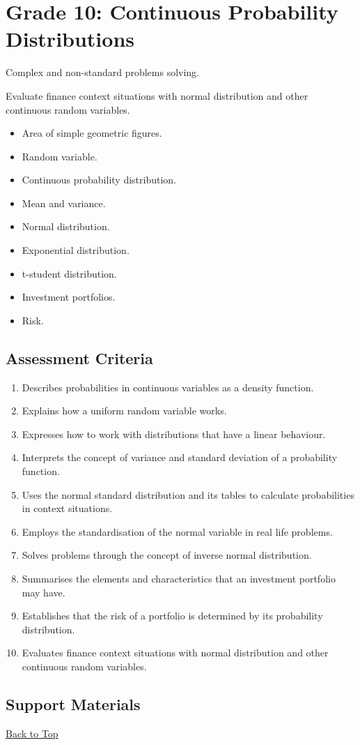 \section{Grade 10: Continuous Probability Distributions}\label{sec:grade10-term3-overview}

Complex and non-standard problems solving.

Evaluate finance context situations with normal distribution and other continuous random variables.

\begin{itemize}
	\item Area of simple geometric figures.
	\item Random variable.
	\item Continuous probability distribution.
	\item Mean and variance.
	\item Normal distribution.
	\item Exponential distribution.
	\item t-student distribution.
	\item Investment portfolios.
	\item Risk.
\end{itemize}

\subsection{Assessment Criteria}\label{sec:grade10-term3-criteria}

\begin{enumerate}
	\item Describes probabilities in continuous variables as a density function.
	\item Explains how a uniform random variable works.
	\item Expresses how to work with distributions that have a linear behaviour.
	\item Interprets the concept of variance and standard deviation of a probability function.
	\item Uses the normal standard distribution and its tables to calculate probabilities in context situations.
	\item Employs the standardisation of the normal variable in real life problems.
	\item Solves problems through the concept of inverse normal distribution.
	\item Summarises the elements and characteristics that an investment portfolio may have.
	\item Establishes that the risk of a portfolio is determined by its probability distribution.
	\item Evaluates finance context situations with normal distribution and other continuous random variables.
\end{enumerate}

\subsection{Support Materials}\label{sec:grade10-term3-support-materials}

\vspace{6pt}
\noindent\hyperref[table-of-contents]{Back to Top}
